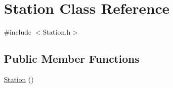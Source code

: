 \hypertarget{classStation}{}\section{Station Class Reference}
\label{classStation}


{\ttfamily \#include $<$Station.\+h$>$}

\subsection*{Public Member Functions}
\begin{DoxyCompactItemize}
\item 
\hyperlink{classStation_a73d335726aad1d844d81cda6d9fd74e6}{Station} ()\hypertarget{classStation_a73d335726aad1d844d81cda6d9fd74e6}{}\label{classStation_a73d335726aad1d844d81cda6d9fd74e6}


\end{DoxyCompactItemize}
